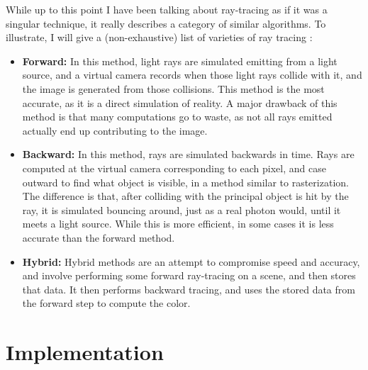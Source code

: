 \documentclass[10pt]{IEEEtran}
\begin{document}
While up to this point I have been talking about ray-tracing as if it was a singular technique, it
really describes a category of similar algorithms. To illustrate, I will give a (non-exhaustive)
list of varieties of ray tracing \cite{stanfordRayTracingTypes}:
\begin{itemize}
    \item \textbf{Forward:} In this method, light rays are simulated emitting from a light source,
    and a virtual camera records when those light rays collide with it, and the image is generated
    from those collisions. This method is the most accurate, as it is a direct simulation of
    reality. A major drawback of this method is that many computations go to waste, as not all rays
    emitted actually end up contributing to the image.
    \item \textbf{Backward:} In this method, rays are simulated backwards in time. Rays are computed
    at the virtual camera corresponding to each pixel, and case outward to find what object is
    visible, in a method similar to rasterization. The difference is that, after colliding with the
    principal object is hit by the ray, it is simulated bouncing around, just as a real photon
    would, until it meets a light source. While this is more efficient, in some cases it is less
    accurate than the forward method.
    \item \textbf{Hybrid:} Hybrid methods are an attempt to compromise speed and accuracy, and
    involve performing some forward ray-tracing on a scene, and then stores that data. It then
    performs backward tracing, and uses the stored data from the forward step to compute the color.
\end{itemize}

\section*{Implementation}
\end{document}
